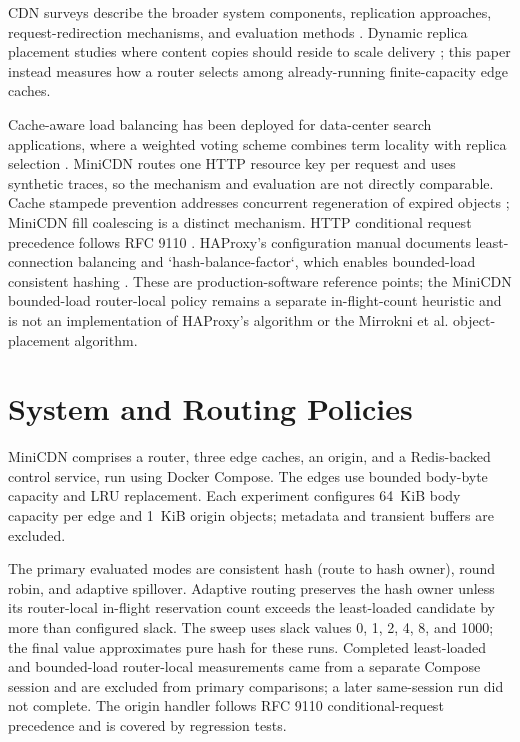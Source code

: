 \documentclass[conference]{IEEEtran}
\begin{document}
CDN surveys describe the broader system components, replication approaches,
request-redirection mechanisms, and evaluation methods
\cite{vakali2003cdn,sahoo2017replica}.
Dynamic replica placement studies where content copies should reside to scale
delivery \cite{chen2002replica}; this paper instead measures how a router
selects among already-running finite-capacity edge caches.

Cache-aware load balancing has been deployed for data-center search
applications, where a weighted voting scheme combines term locality with
replica selection \cite{archer2019cacheaware}. MiniCDN routes one HTTP
resource key per request and uses synthetic traces, so the mechanism and
evaluation are not directly comparable. Cache stampede prevention addresses
concurrent regeneration of expired objects \cite{vattani2015stampede};
MiniCDN fill coalescing is a distinct mechanism. HTTP conditional request
precedence follows RFC 9110 \cite{rfc9110}.
HAProxy's configuration manual documents least-connection balancing and
`hash-balance-factor`, which enables bounded-load consistent hashing
\cite{haproxy2026manual}. These are production-software reference points; the
MiniCDN bounded-load router-local policy remains a separate in-flight-count
heuristic and is not an implementation of HAProxy's algorithm or the
Mirrokni et al. object-placement algorithm.

\section{System and Routing Policies}
MiniCDN comprises a router, three edge caches, an origin, and a Redis-backed
control service, run using Docker Compose. The edges use bounded body-byte
capacity and LRU replacement. Each experiment configures 64~KiB body capacity
per edge and 1~KiB origin objects; metadata and transient buffers are excluded.

The primary evaluated modes are consistent hash (route to hash owner), round
robin, and adaptive spillover.
Adaptive routing preserves the hash owner unless its router-local in-flight
reservation count exceeds the least-loaded candidate by more than configured
slack. The sweep uses slack values 0, 1, 2, 4, 8, and 1000; the final value
approximates pure hash for these runs. Completed least-loaded and bounded-load
router-local measurements came from a separate Compose session and are
excluded from primary comparisons; a later same-session run did not complete.
The origin handler follows RFC 9110 conditional-request precedence and is
covered by regression tests.
\end{document}
